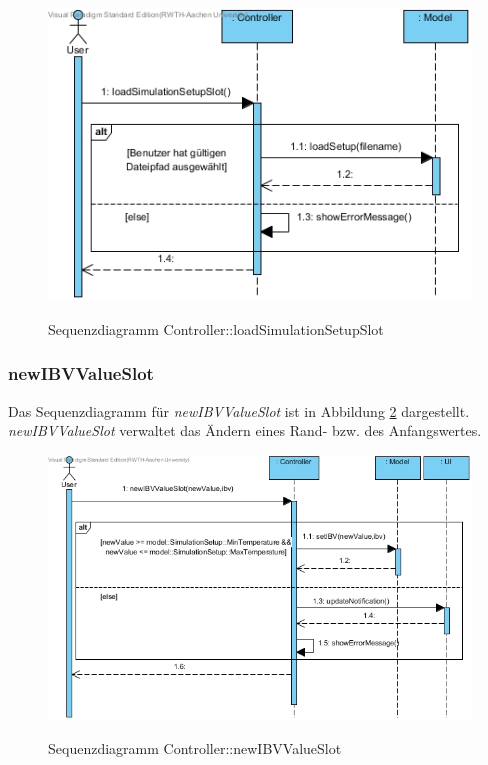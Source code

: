 \begin{figure}[H]
	\centering
	\includegraphics[scale=.6]{Bilder/Controller__loadSimulationSetupSlot().jpg}\\
	\caption{Sequenzdiagramm Controller::loadSimulationSetupSlot}
	\label{Sequenzdiagramm Controller::loadSimulationSetupSlot}
\end{figure}

\subsubsection*{newIBVValueSlot}

Das Sequenzdiagramm für \emph{newIBVValueSlot} ist in Abbildung \ref{Sequenzdiagramm Controller::newIBVValueSlot} dargestellt. \emph{newIBVValueSlot} verwaltet das Ändern eines Rand- bzw. des Anfangswertes.

\begin{figure}[H]
	\centering
	\includegraphics[scale=.7]{Bilder/Controller__newIBVValueSlot().jpg}\\
	\caption{Sequenzdiagramm Controller::newIBVValueSlot}
	\label{Sequenzdiagramm Controller::newIBVValueSlot}
\end{figure}

